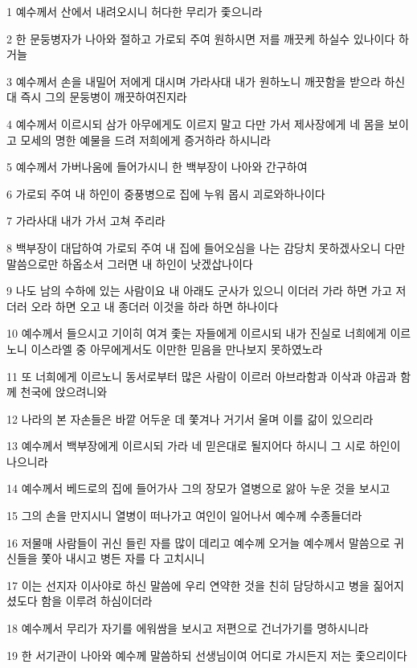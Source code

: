 \par 1 예수께서 산에서 내려오시니 허다한 무리가 좇으니라
\par 2 한 문둥병자가 나아와 절하고 가로되 주여 원하시면 저를 깨끗케 하실수 있나이다 하거늘
\par 3 예수께서 손을 내밀어 저에게 대시며 가라사대 내가 원하노니 깨끗함을 받으라 하신대 즉시 그의 문둥병이 깨끗하여진지라
\par 4 예수께서 이르시되 삼가 아무에게도 이르지 말고 다만 가서 제사장에게 네 몸을 보이고 모세의 명한 예물을 드려 저희에게 증거하라 하시니라
\par 5 예수께서 가버나움에 들어가시니 한 백부장이 나아와 간구하여
\par 6 가로되 주여 내 하인이 중풍병으로 집에 누워 몹시 괴로와하나이다
\par 7 가라사대 내가 가서 고쳐 주리라
\par 8 백부장이 대답하여 가로되 주여 내 집에 들어오심을 나는 감당치 못하겠사오니 다만 말씀으로만 하옵소서 그러면 내 하인이 낫겠삽나이다
\par 9 나도 남의 수하에 있는 사람이요 내 아래도 군사가 있으니 이더러 가라 하면 가고 저더러 오라 하면 오고 내 종더러 이것을 하라 하면 하나이다
\par 10 예수께서 들으시고 기이히 여겨 좇는 자들에게 이르시되 내가 진실로 너희에게 이르노니 이스라엘 중 아무에게서도 이만한 믿음을 만나보지 못하였노라
\par 11 또 너희에게 이르노니 동서로부터 많은 사람이 이르러 아브라함과 이삭과 야곱과 함께 천국에 앉으려니와
\par 12 나라의 본 자손들은 바깥 어두운 데 쫓겨나 거기서 울며 이를 갊이 있으리라
\par 13 예수께서 백부장에게 이르시되 가라 네 믿은대로 될지어다 하시니 그 시로 하인이 나으니라
\par 14 예수께서 베드로의 집에 들어가사 그의 장모가 열병으로 앓아 누운 것을 보시고
\par 15 그의 손을 만지시니 열병이 떠나가고 여인이 일어나서 예수께 수종들더라
\par 16 저물매 사람들이 귀신 들린 자를 많이 데리고 예수께 오거늘 예수께서 말씀으로 귀신들을 쫓아 내시고 병든 자를 다 고치시니
\par 17 이는 선지자 이사야로 하신 말씀에 우리 연약한 것을 친히 담당하시고 병을 짊어지셨도다 함을 이루려 하심이더라
\par 18 예수께서 무리가 자기를 에워쌈을 보시고 저편으로 건너가기를 명하시니라
\par 19 한 서기관이 나아와 예수께 말씀하되 선생님이여 어디로 가시든지 저는 좇으리이다
